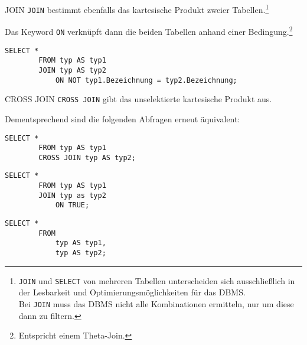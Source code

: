 \begin{sql}{JOIN}
    \texttt{JOIN} bestimmt ebenfalls das kartesische Produkt zweier Tabellen.\footnote{
        \texttt{JOIN} und \texttt{SELECT} von mehreren Tabellen unterscheiden sich ausschließlich in der Lesbarkeit und Optimierungsmöglichkeiten für das DBMS. \\
        Bei \texttt{JOIN} muss das DBMS nicht alle Kombinationen ermitteln, nur um diese dann zu filtern.
    }

    Das Keyword \texttt{ON} verknüpft dann die beiden Tabellen anhand einer Bedingung.\footnote{Entspricht einem Theta-Join.}
    \begin{lstlisting}[language=mysql]
        SELECT *
        FROM typ AS typ1
        JOIN typ AS typ2
            ON NOT typ1.Bezeichnung = typ2.Bezeichnung;
    \end{lstlisting}
\end{sql}

\begin{sql}{CROSS JOIN}
    \texttt{CROSS JOIN} gibt das unselektierte kartesische Produkt aus.

    Dementsprechend sind die folgenden Abfragen erneut äquivalent:

    \begin{lstlisting}[language=mysql]
        SELECT *
        FROM typ AS typ1
        CROSS JOIN typ AS typ2;
    \end{lstlisting}

    \begin{lstlisting}[language=mysql]
        SELECT *
        FROM typ AS typ1
        JOIN typ as typ2
            ON TRUE;
    \end{lstlisting}

    \begin{lstlisting}[language=mysql]
        SELECT *
        FROM
            typ AS typ1,
            typ AS typ2;
    \end{lstlisting}
\end{sql}

